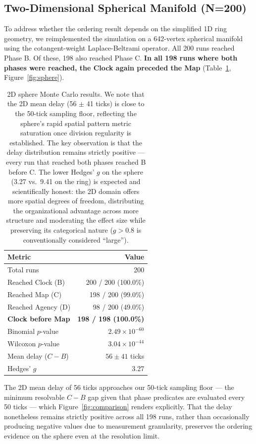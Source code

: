 \documentclass[11pt,letterpaper]{article}
\begin{document}
\subsection{Two-Dimensional Spherical Manifold (N=200)}
\label{sec:2d-results}

To address whether the ordering result depends on the simplified 1D ring geometry, we reimplemented the simulation on a 642-vertex spherical manifold using the cotangent-weight Laplace-Beltrami operator. All 200 runs reached Phase B. Of these, 198 also reached Phase C. \textbf{In all 198 runs where both phases were reached, the Clock again preceded the Map} (Table~\ref{tab:2d}, Figure~\ref{fig:sphere}).

\begin{table}[H]
\centering
\small
\begin{tabular}{lr}
\toprule
\textbf{Metric} & \textbf{Value} \\
\midrule
Total runs & 200 \\
Reached Clock (B) & 200 / 200 (100.0\%) \\
Reached Map (C) & 198 / 200 (99.0\%) \\
Reached Agency (D) & 98 / 200 (49.0\%) \\
\midrule
\textbf{Clock before Map} & \textbf{198 / 198 (100.0\%)} \\
Binomial $p$-value & $2.49 \times 10^{-60}$ \\
Wilcoxon $p$-value & $3.04 \times 10^{-44}$ \\
Mean delay ($C - B$) & $56 \pm 41$ ticks \\
Hedges' $g$ & 3.27 \\
\bottomrule
\end{tabular}
\caption{\label{tab:2d}2D sphere Monte Carlo results. We note that the 2D mean delay (56 $\pm$ 41 ticks) is close to the 50-tick sampling floor, reflecting the sphere's rapid spatial pattern metric saturation once division regularity is established. The key observation is that the delay distribution remains strictly positive --- every run that reached both phases reached B before C. The lower Hedges' $g$ on the sphere (3.27 vs.\ 9.41 on the ring) is expected and scientifically honest: the 2D domain offers more spatial degrees of freedom, distributing the organizational advantage across more structure and moderating the effect size while preserving its categorical nature ($g > 0.8$ is conventionally considered ``large'').}
\end{table}

The 2D mean delay of 56 ticks approaches our 50-tick sampling floor --- the minimum resolvable $C - B$ gap given that phase predicates are evaluated every 50 ticks --- which Figure~\ref{fig:comparison} renders explicitly. That the delay nonetheless remains strictly positive across all 198 runs, rather than occasionally producing negative values due to measurement granularity, preserves the ordering evidence on the sphere even at the resolution limit.
\end{document}
